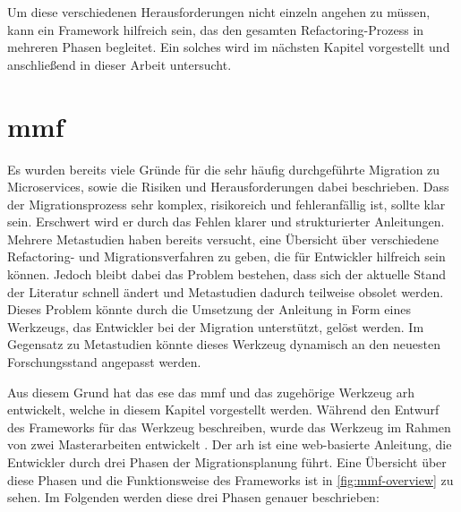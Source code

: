 Um diese verschiedenen Herausforderungen nicht einzeln angehen zu müssen, kann ein Framework hilfreich sein, das den gesamten Refactoring-Prozess in mehreren Phasen begleitet.
Ein solches wird im nächsten Kapitel vorgestellt und anschließend in dieser Arbeit untersucht.

\section{\acrfull{mmf}}
\label{sec:mmf}

Es wurden bereits viele Gründe für die sehr häufig durchgeführte Migration zu Microservices, sowie die Risiken und Herausforderungen dabei beschrieben.
Dass der Migrationsprozess sehr komplex, risikoreich und fehleranfällig ist, sollte klar sein.
Erschwert wird er durch das Fehlen klarer und strukturierter Anleitungen.
Mehrere Metastudien haben bereits versucht, eine Übersicht über verschiedene Refactoring- und Migrationsverfahren zu geben, die für Entwickler hilfreich sein können.
Jedoch bleibt dabei das Problem bestehen, dass sich der aktuelle Stand der Literatur schnell ändert und Metastudien dadurch teilweise obsolet werden.
Dieses Problem könnte durch die Umsetzung der Anleitung in Form eines Werkzeugs, das Entwickler bei der Migration unterstützt, gelöst werden.
Im Gegensatz zu Metastudien könnte dieses Werkzeug dynamisch an den neuesten Forschungsstand angepasst werden.

Aus diesem Grund hat das \gls{ese} das \acrfull{mmf} und das zugehörige Werkzeug \gls{arh} \cite{arh-github} entwickelt, welche in diesem Kapitel vorgestellt werden.
Während  den Entwurf des Frameworks für das Werkzeug beschreiben, wurde das Werkzeug im Rahmen von zwei Masterarbeiten entwickelt \cite{master-daniel-koch,master-tobias-haller}.
Der \gls{arh} ist eine web-basierte Anleitung, die Entwickler durch drei Phasen der Migrationsplanung führt.
Eine Übersicht über diese Phasen und die Funktionsweise des Frameworks ist in \cref{fig:mmf-overview} zu sehen.
Im Folgenden werden diese drei Phasen genauer beschrieben:

